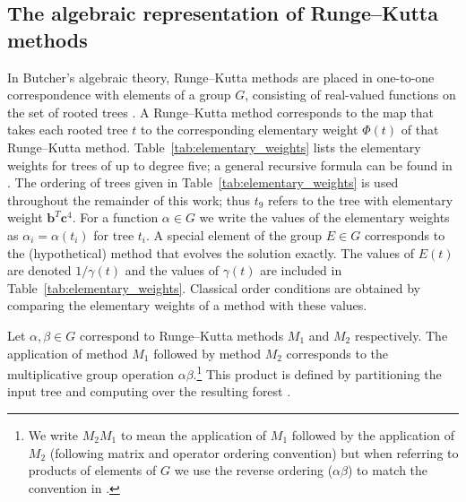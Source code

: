 \subsection{The algebraic representation of Runge--Kutta methods}\label{subsec:Algebraic_representation}

In Butcher's algebraic theory, Runge--Kutta methods
are placed in one-to-one correspondence with elements of a group
$G$, consisting of real-valued functions on the set of rooted trees \cite{Butcher2008_book}.
A Runge--Kutta method corresponds to the map that takes each rooted tree $t$
to the corresponding elementary weight $\Phi(t)$ of that Runge--Kutta method.
Table~\ref{tab:elementary_weights} lists the elementary weights for trees of
up to degree five; a general recursive formula can be found in
\cite[Definition 312A]{Butcher2008_book}.
The ordering of trees given in Table~\ref{tab:elementary_weights} is used
throughout the remainder of this work; thus $t_9$ refers to the tree with
elementary weight $\bm{b}^T \bm{c}^4$.
For a function $\alpha \in G$ we write the values of the
elementary weights as $\alpha_{i} = \alpha(t_{i})$ for tree $t_{i}$.
A special element of the group $E \in G$ corresponds to the
(hypothetical) method that evolves the solution exactly.
The values of $E(t)$ are denoted $1/\gamma(t)$ \cite{Butcher2008_book}
and the values of $\gamma(t)$ are included in
Table~\ref{tab:elementary_weights}.
Classical order conditions are obtained by comparing the elementary weights 
of a method with these values.

Let $\alpha, \beta \in G$ correspond to Runge--Kutta methods $M_1$ and $M_2$
respectively.
The application of method $M_1$ followed by method $M_2$ corresponds to
the multiplicative group operation $\alpha\beta$.\footnote{We write
	$M_2M_1$ to mean the application of $M_1$
	followed by the application of $M_2$
	(following matrix and operator ordering convention)
	but when referring to products of elements of $G$
        we use the reverse ordering ($\alpha\beta$)
	to match the convention in \cite{Butcher2008_book}.}
This product is defined by partitioning the input tree and computing
over the resulting forest \cite[\S~383]{Butcher2008_book}.

